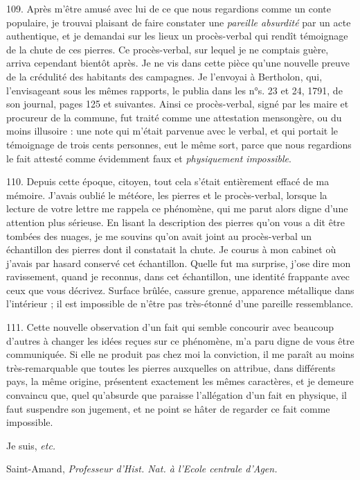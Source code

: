 \documentclass[a4paper, 11pt, oneside, polutonikogreek, french]{article}
\begin{document}
109. Après m'être amusé avec lui de ce que nous regardions comme un conte populaire, je trouvai plaisant de faire constater une \emph{pareille absurdité} par un acte authentique, et je demandai sur les lieux un procès-verbal qui rendît témoignage de la chute de ces pierres. Ce procès-verbal, sur lequel je ne comptais guère, arriva cependant bientôt après. Je ne vis dans cette pièce qu'une nouvelle preuve de la crédulité des habitants des campagnes. Je l'envoyai à Bertholon, qui, l'envisageant sous les mêmes rapports, le publia dans les n°s. 23 et 24, 1791, de son journal, pages 125 et suivantes. Ainsi ce procès-verbal, signé par les maire et procureur de la commune, fut traité comme une attestation mensongère, ou du moins illusoire : une note qui m'était parvenue avec le verbal, et qui portait le témoignage de trois cents personnes, eut le même sort, parce que nous regardions le fait attesté comme évidemment faux et \emph{physiquement impossible}.

110. Depuis cette époque, citoyen, tout cela s'était entièrement effacé de ma mémoire. J'avais oublié le météore, les pierres et le procès-verbal, lorsque la lecture de votre lettre me rappela ce phénomène, qui me parut alors digne d'une attention plus sérieuse. En lisant la description des pierres qu'on vous a dit être tombées des nuages, je me souvins qu'on avait joint au procès-verbal un échantillon des pierres dont il constatait la chute. Je courus à mon cabinet où j'avais par hasard conservé cet échantillon. Quelle fut ma surprise, j'ose dire mon ravissement, quand je reconnus, dans cet échantillon, une identité frappante avec ceux que vous décrivez. Surface brûlée, cassure grenue, apparence métallique dans l'intérieur ; il est impossible de n'être pas très-étonné d'une pareille ressemblance.

111. Cette nouvelle observation d'un fait qui semble concourir avec beaucoup d'autres à changer les idées reçues sur ce phénomène, m'a paru digne de vous être communiquée. Si elle ne produit pas chez moi la conviction, il me paraît au moins très-remarquable que toutes les pierres auxquelles on attribue, dans différents pays, la même origine, présentent exactement les mêmes caractères, et je demeure convaincu que, quel qu’absurde que paraisse l'allégation d'un fait en physique, il faut suspendre son jugement, et ne point se hâter de regarder ce fait comme impossible.

Je suis, \emph{etc.}

Saint-Amand, \emph{Professeur d'Hist. Nat. à l'Ecole centrale d'Agen.}
\end{document}
